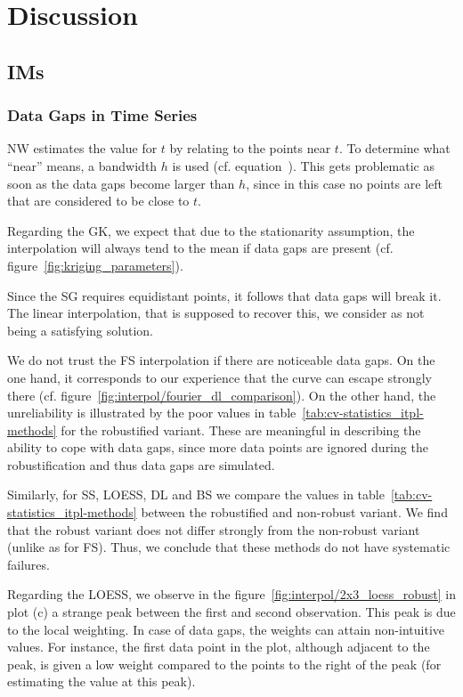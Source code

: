 \chapter{Discussion}\label{sec:discussion}

\section{{{IM}}s}{ \label{sec:discussion_itpl}
    \subsection{Data Gaps in Time Series}\label{sec:discussion_itpl_data_gaps}{
        NW estimates the value for $t$ by relating to the points near $t$. To determine what ``near'' means, a bandwidth $h$ is used (cf. equation~). This gets problematic as soon as the data gaps become larger than $h$, since in this case no points are left that are considered to be close to $t$. 

        Regarding the GK, we expect that due to the stationarity assumption, the interpolation will always tend to the mean if data gaps are present (cf. figure~\ref{fig:kriging_parameters}). 

        Since the SG requires equidistant points, it follows that data gaps will break it. The linear interpolation, that is supposed to recover this, we consider as not being a satisfying solution.

        We do not trust the FS interpolation if there are noticeable data gaps. On the one hand, it corresponds to our experience that the curve can escape strongly there (cf. figure~\ref{fig:interpol/fourier_dl_comparison}). On the other hand, the unreliability is illustrated by the poor values in table~\ref{tab:cv-statistics_itpl-methods} for the robustified variant. These are meaningful in describing the ability to cope with data gaps, since more data points are ignored during the robustification and thus data gaps are simulated. 

        Similarly, for SS, LOESS, DL and BS we compare the values in table~\ref{tab:cv-statistics_itpl-methods} between the robustified and non-robust variant. We find that the robust variant does not differ strongly from the non-robust variant (unlike as for FS). Thus, we conclude that these methods do not have systematic failures.

        Regarding the LOESS, we observe in the figure~\ref{fig:interpol/2x3_loess_robust} in plot (c) a strange peak between the first and second observation. This peak is due to the local weighting. In case of data gaps, the weights can attain non-intuitive values. For instance, the first data point in the plot, although adjacent to the peak, is given a low weight compared to the points to the right of the peak (for estimating the value at this peak).

}}
